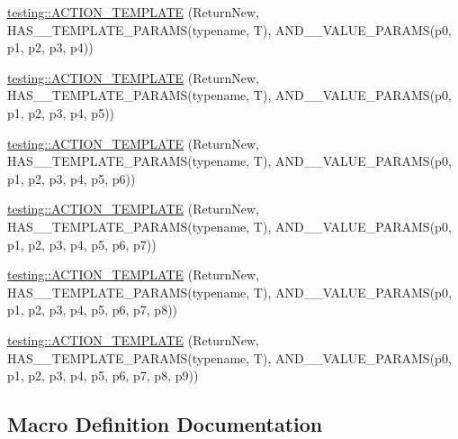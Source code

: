 \begin{DoxyCompactItemize}
\item 
\hyperlink{namespacetesting_a0c03444379adfb849db243829946c1ed}{testing\+::\+A\+C\+T\+I\+O\+N\+\_\+\+T\+E\+M\+P\+L\+A\+TE} (Return\+New, H\+A\+S\+\_\+\_\+\+T\+E\+M\+P\+L\+A\+T\+E\+\_\+\+P\+A\+R\+A\+MS(typename, T), A\+N\+D\+\_\+\_\+\+V\+A\+L\+U\+E\+\_\+\+P\+A\+R\+A\+MS(p0, p1, p2, p3, p4))
\item 
\hyperlink{namespacetesting_a2ef1b31693ee2be0bb93602b375fb9ce}{testing\+::\+A\+C\+T\+I\+O\+N\+\_\+\+T\+E\+M\+P\+L\+A\+TE} (Return\+New, H\+A\+S\+\_\+\_\+\+T\+E\+M\+P\+L\+A\+T\+E\+\_\+\+P\+A\+R\+A\+MS(typename, T), A\+N\+D\+\_\+\_\+\+V\+A\+L\+U\+E\+\_\+\+P\+A\+R\+A\+MS(p0, p1, p2, p3, p4, p5))
\item 
\hyperlink{namespacetesting_a7b4cfa09367e9938561eeca5a105d183}{testing\+::\+A\+C\+T\+I\+O\+N\+\_\+\+T\+E\+M\+P\+L\+A\+TE} (Return\+New, H\+A\+S\+\_\+\_\+\+T\+E\+M\+P\+L\+A\+T\+E\+\_\+\+P\+A\+R\+A\+MS(typename, T), A\+N\+D\+\_\+\_\+\+V\+A\+L\+U\+E\+\_\+\+P\+A\+R\+A\+MS(p0, p1, p2, p3, p4, p5, p6))
\item 
\hyperlink{namespacetesting_a76d58331453ee0a2eb75a5992e35197b}{testing\+::\+A\+C\+T\+I\+O\+N\+\_\+\+T\+E\+M\+P\+L\+A\+TE} (Return\+New, H\+A\+S\+\_\+\_\+\+T\+E\+M\+P\+L\+A\+T\+E\+\_\+\+P\+A\+R\+A\+MS(typename, T), A\+N\+D\+\_\+\_\+\+V\+A\+L\+U\+E\+\_\+\+P\+A\+R\+A\+MS(p0, p1, p2, p3, p4, p5, p6, p7))
\item 
\hyperlink{namespacetesting_adfb5791a941ec1f2a2f8067fd9ac7667}{testing\+::\+A\+C\+T\+I\+O\+N\+\_\+\+T\+E\+M\+P\+L\+A\+TE} (Return\+New, H\+A\+S\+\_\+\_\+\+T\+E\+M\+P\+L\+A\+T\+E\+\_\+\+P\+A\+R\+A\+MS(typename, T), A\+N\+D\+\_\+\_\+\+V\+A\+L\+U\+E\+\_\+\+P\+A\+R\+A\+MS(p0, p1, p2, p3, p4, p5, p6, p7, p8))
\item 
\hyperlink{namespacetesting_a3934a47f6125504c939a3573b7fc55c4}{testing\+::\+A\+C\+T\+I\+O\+N\+\_\+\+T\+E\+M\+P\+L\+A\+TE} (Return\+New, H\+A\+S\+\_\+\_\+\+T\+E\+M\+P\+L\+A\+T\+E\+\_\+\+P\+A\+R\+A\+MS(typename, T), A\+N\+D\+\_\+\_\+\+V\+A\+L\+U\+E\+\_\+\+P\+A\+R\+A\+MS(p0, p1, p2, p3, p4, p5, p6, p7, p8, p9))
\end{DoxyCompactItemize}


\subsection{Macro Definition Documentation}
